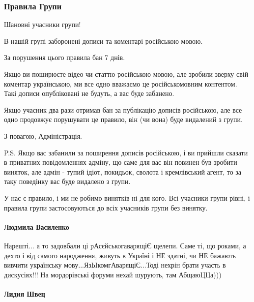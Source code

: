  
 
 

\subsubsection{Правила Групи}
\label{sec:nenavyst.mova.fb.promovugroup.1.rules}

Шановні учасники групи!

В нашій групі заборонені дописи та коментарі російською мовою.

За порушення цього правила бан 7 днів. 

Якщо ви поширюєте відео чи статтю російською мовою, але зробили зверху свій
коментар українською, ми все одно вважаємо це російськомовним контентом. Такі
дописи опубліковані не будуть, а вас буде забанено.

Якщо учасник два рази отримав бан за публікацію дописів російською, але все
одно продовжує порушувати це правило, він (чи вона) буде видалений з групи.

З повагою,
Адміністрація.

P.S. Якщо вас забанили за поширення дописів російською, і ви прийшли сказати в
приватних повідомленнях адміну, що саме для вас він повинен був зробити
виняток, але адмін - тупий ідіот, покидьок, сволота і кремлівський агент, то за
таку поведінку вас буде видалено з групи. 

У нас є правило, і ми не робимо винятків ні для кого. Всі учасники групи рівні,
і правила групи застосовуються до всіх учасників групи без винятку.

\paragraph{Людмила Василенко}

Нарешті... а то задовбали ці рАсєйськогаварящіЄ щелепи. Саме ті, що роками, а
дехто і від самого народження, живуть в Україні і НЕ здатні, чи НЕ бажають
вивчити українську мову...ЯзЬІкомгАварящіЄ...Тоді нехрін брати участь в
дискусіях!!! На мордорівські форуми нехай шурують, там АбщаюЦЦа)))

\paragraph{Лидия Швец}

